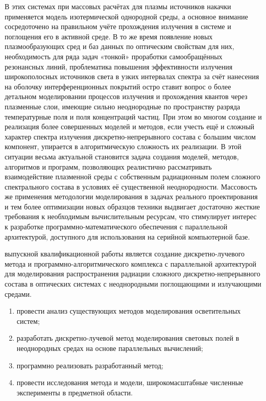 В этих системах при массовых расчётах для плазмы источников накачки применяется модель изотермической однородной среды, а основное внимание сосредоточено на правильном учёте прохождения излучения в системе и поглощения его в активной среде.
В то же время появление новых плазмообразующих сред и баз данных по оптическим свойствам для них, необходимость для ряда задач «тонкой» проработки самообращённых резонансных линий, проблематика повышения эффективности излучения широкополосных источников света в узких интервалах спектра за счёт нанесения на оболочку интерференционных покрытий остро ставит вопрос о более детальном моделировании процессов излучения и прохождения квантов через плазменные слои, имеющие сильно неоднородные по пространству разряда температурные поля и поля концентраций частиц.
При этом во многом создание и реализация более совершенных моделей и методов, если учесть ещё и сложный характер спектра излучения дискретно-непрерывного состава с большим числом компонент, упирается в алгоритмическую сложность их реализации.
В этой ситуации весьма актуальной становится задача создания моделей, методов, алгоритмов и программ, позволяющих реалистично рассматривать взаимодействие плазменной среды с собственным радиационным полем сложного спектрального состава в условиях её существенной неоднородности.
Массовость же применения методологии моделирования в задачах реального проектирования и тем более  оптимизации новых образцов техники выдвигает достаточно жесткие требования к необходимым вычислительным ресурсам, что стимулирует интерес к разработке программно-математического обеспечения с параллельной архитектурой, доступного для использования на серийной компьютерной базе.

 выпускной квалификационной работы является создание дискретно-лучевого метода и программно-алгоритмического комплекса с параллельной архитектурой для моделирования распространения радиации сложного дискретно-непрерывного состава в оптических системах с неоднородными поглощающими и излучающими средами.


\begin{enumerate}
	\item провести анализ существующих методов моделирования осветительных систем;
	\item разработать дискретно-лучевой метод моделирования световых полей в неоднородных средах на основе параллельных вычислений;
	\item программно реализовать разработанный метод;
	\item провести исследования метода и модели, широкомасштабные численные эксперименты в предметной области.
\end{enumerate}

